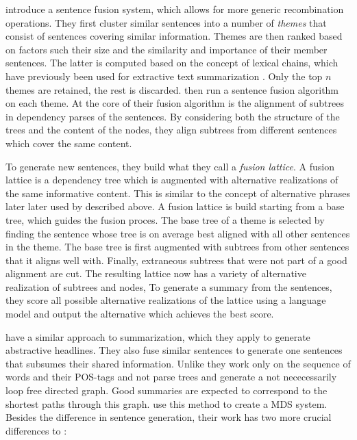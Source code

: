 \documentclass[a4paper,BCOR=10mm]{report}
\numberwithin{lemma}{chapter}
\numberwithin{definition}{chapter}
\begin{document}
\citet{barzilay+mckeown} introduce a sentence fusion system, which allows for more generic recombination operations. They first cluster similar sentences into a number of \textit{themes} that consist of sentences covering similar information.
Themes are then ranked based on factors such their size and the similarity and importance of their member sentences. The latter is computed based on the concept of lexical chains, which have previously been used for extractive text summarization \citep{lexical-chains}. Only the top $n$ themes are retained, the rest is discarded.
\citeauthor{barzilay+mckeown} then run a sentence fusion algorithm on each theme.
At the core of their fusion algorithm is the alignment of subtrees in dependency parses of the sentences.
By considering both the structure of the trees and the content of the nodes, they align subtrees from different sentences which cover the same content.

To generate new sentences, they build what they call a \textit{fusion lattice}. A fusion lattice is a dependency tree which is augmented with alternative realizations of the same informative content. This is similar to the concept of alternative phrases later later used by \citet{bing} described above.
A fusion lattice is build starting from a base tree, which guides the fusion proces. The base tree of a theme is selected by finding the sentence whose tree is on average best aligned with all other sentences in the theme.
The base tree is first augmented with subtrees from other sentences that it aligns well with. Finally, extraneous subtrees that were not part of a good alignment are cut.
The resulting lattice now has a variety of alternative realization of subtrees and nodes,
To generate a summary from the sentences, they score all possible alternative realizations of the lattice using a language model and output the alternative which achieves the best score.

\citet{filippova} have a similar approach to summarization, which they apply to generate abstractive headlines. They also fuse similar sentences to generate one sentences that subsumes their shared information. Unlike \citet{barzilay+mckeown} they work only on the sequence of words and their POS-tags and not parse trees and generate a not nececessarily loop free directed graph. Good summaries are expected to correspond to the shortest paths through this graph.
\citet{banerjee} use this method to create a MDS system. Besides the difference in sentence generation, their work has two more crucial differences to \citeauthor{barzilay+mckeown}:
\end{document}
